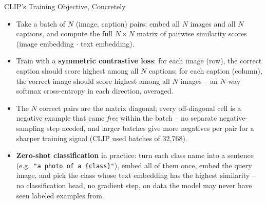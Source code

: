 \begin{vbframe}{CLIP's Training Objective, Concretely}
\begin{itemize}
  \item Take a batch of $N$ (image, caption) pairs; embed all $N$ images and all $N$ captions, and compute the full $N\times N$ matrix of pairwise similarity scores (image embedding $\cdot$ text embedding).
  \item Train with a \textbf{symmetric contrastive loss}: for each image (row), the correct caption should score highest among all $N$ captions; for each caption (column), the correct image should score highest among all $N$ images -- an $N$-way softmax cross-entropy in each direction, averaged.
  \item The $N$ correct pairs are the matrix diagonal; every off-diagonal cell is a negative example that came \emph{free} within the batch -- no separate negative-sampling step needed, and larger batches give more negatives per pair for a sharper training signal (CLIP used batches of 32,768).
  \item \textbf{Zero-shot classification} in practice: turn each class name into a sentence (e.g.\ \texttt{"a photo of a \{class\}"}), embed all of them once, embed the query image, and pick the class whose text embedding has the highest similarity -- no classification head, no gradient step, on data the model may never have seen labeled examples from.
\end{itemize}
\end{vbframe}

